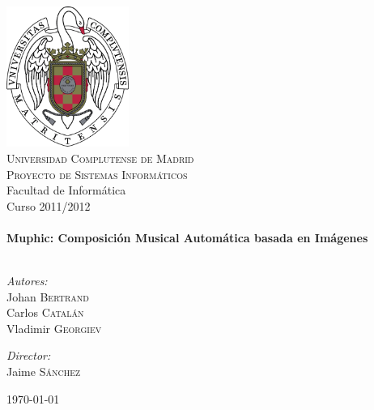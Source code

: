 
\begin{titlepage}
\thispagestyle{empty}
  \begin{adjustwidth}{0cm}{-1cm}


\begin{center}


\includegraphics[width=0.3\textwidth]{./graphics/escudo-ucm.png}\\[1cm]    

\textsc{\LARGE Universidad Complutense de Madrid}\\[1.5cm]

\textsc{\Large Proyecto de Sistemas Informáticos}\\[0.5cm]
Facultad de Informática\\
Curso 2011/2012\\


\HRule \\[0.4cm]
{ \huge \bfseries Muphic: Composición Musical Automática basada en Imágenes}\\[0.4cm]

\HRule \\[1.5cm]

\begin{minipage}{0.4\textwidth}
\begin{flushleft} \large
\emph{Autores:}\\
Johan \textsc{Bertrand}\\
Carlos \textsc{Catalán}\\
Vladimir \textsc{Georgiev}
\end{flushleft}
\end{minipage}
\begin{minipage}{0.4\textwidth}
\begin{flushright} \large
\emph{Director:} \\
Jaime \textsc{Sánchez}
\end{flushright}
\end{minipage}

\vfill

{\large \today}

\end{center}

  \end{adjustwidth}
\end{titlepage}
